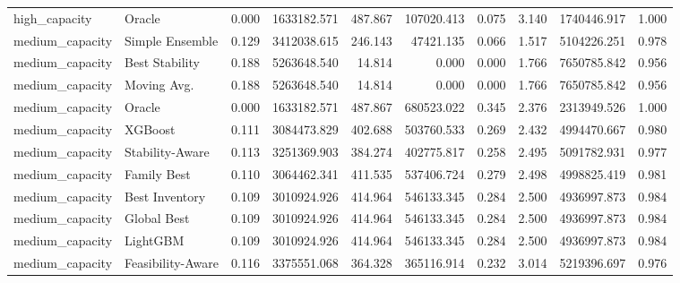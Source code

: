 \begin{table}
{\begin{tabular}{llrrrrrrrr}
     high\_capacity &             Oracle & 0.000 &     1633182.571 &           487.867 &         107020.413 &           0.075 &                  3.140 &     1740446.917 &          1.000 \\
   medium\_capacity &    Simple Ensemble & 0.129 &     3412038.615 &           246.143 &          47421.135 &           0.066 &                  1.517 &     5104226.251 &          0.978 \\
   medium\_capacity &     Best Stability & 0.188 &     5263648.540 &            14.814 &              0.000 &           0.000 &                  1.766 &     7650785.842 &          0.956 \\
   medium\_capacity &        Moving Avg. & 0.188 &     5263648.540 &            14.814 &              0.000 &           0.000 &                  1.766 &     7650785.842 &          0.956 \\
   medium\_capacity &             Oracle & 0.000 &     1633182.571 &           487.867 &         680523.022 &           0.345 &                  2.376 &     2313949.526 &          1.000 \\
   medium\_capacity &            XGBoost & 0.111 &     3084473.829 &           402.688 &         503760.533 &           0.269 &                  2.432 &     4994470.667 &          0.980 \\
   medium\_capacity &    Stability-Aware & 0.113 &     3251369.903 &           384.274 &         402775.817 &           0.258 &                  2.495 &     5091782.931 &          0.977 \\
   medium\_capacity &        Family Best & 0.110 &     3064462.341 &           411.535 &         537406.724 &           0.279 &                  2.498 &     4998825.419 &          0.981 \\
   medium\_capacity &     Best Inventory & 0.109 &     3010924.926 &           414.964 &         546133.345 &           0.284 &                  2.500 &     4936997.873 &          0.984 \\
   medium\_capacity &        Global Best & 0.109 &     3010924.926 &           414.964 &         546133.345 &           0.284 &                  2.500 &     4936997.873 &          0.984 \\
   medium\_capacity &           LightGBM & 0.109 &     3010924.926 &           414.964 &         546133.345 &           0.284 &                  2.500 &     4936997.873 &          0.984 \\
   medium\_capacity &  Feasibility-Aware & 0.116 &     3375551.068 &           364.328 &         365116.914 &           0.232 &                  3.014 &     5219396.697 &          0.976 \\

\end{tabular}}
\end{table}
